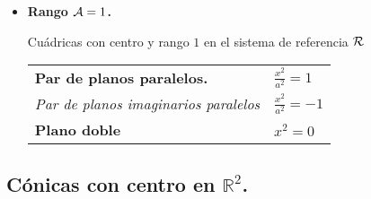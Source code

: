 \documentclass[11pt, a4paper, titlepage]{article}
\theoremstyle{theorem-style}
\theoremstyle{definition-style}
\theoremstyle{remark-style}
\theoremstyle{example-style}
\begin{document}
\begin{itemize}
Consideramos cu\'adricas con centro y rango $2$ en el sistema de referencia $\cal R$

\vspace{.5cm}

\begin{tabular}{ll}
{\bf Cilindro el\'iptico} \hspace{5cm} & 
$
\frac{{x}^2}{a^2} + \frac{{y}^2}{b^2}=1
$
\vspace{.5cm}
\\
{\it Cilindro imaginario}  &
$
-\frac{{x}^2}{a^2} - \frac{{y}^2}{b^2}=1
$
\vspace{.5cm}
\\
{\bf  Cilindro hiperb\'olico}  &
$
\frac{{x}^2}{a^2} - \frac{{y}^2}{b^2}=1
$
\vspace{.5cm}
\\
{\bf  Par de planos reales}  &
$
\frac{{x}^2}{a^2} - \frac{{y}^2}{b^2}=0
$
\vspace{.5cm}
\\
{\it Par de planos imaginarios} &
$
\frac{{x}^2}{a^2} + \frac{{y}^2}{b^2}=0
$
\vspace{.3cm}
\\
\end{tabular}
 


\item {\bf Rango ${\cal A}=1$.} 

\vspace{.4cm}

Cu\'adricas con centro y rango $1$ en el sistema de referencia $\cal R$

\vspace{.5cm}

\begin{tabular}{ll}
{\bf  Par de planos paralelos.} \hspace{5cm} & 
$
\frac{{x}^2}{a^2}=1
$
\vspace{.4cm}
\\
{\it Par de planos imaginarios paralelos}  &
$
\frac{{x}^2}{a^2} =-1
$
\vspace{.4cm}
\\
{\bf  Plano doble}  &
$
{{x}^2} = 0
$
\vspace{.3cm}
\\
\end{tabular}

\end{itemize}


\subsection{\bf  C\'onicas con centro en $\mathbb{R}^2$.}
\end{document}
